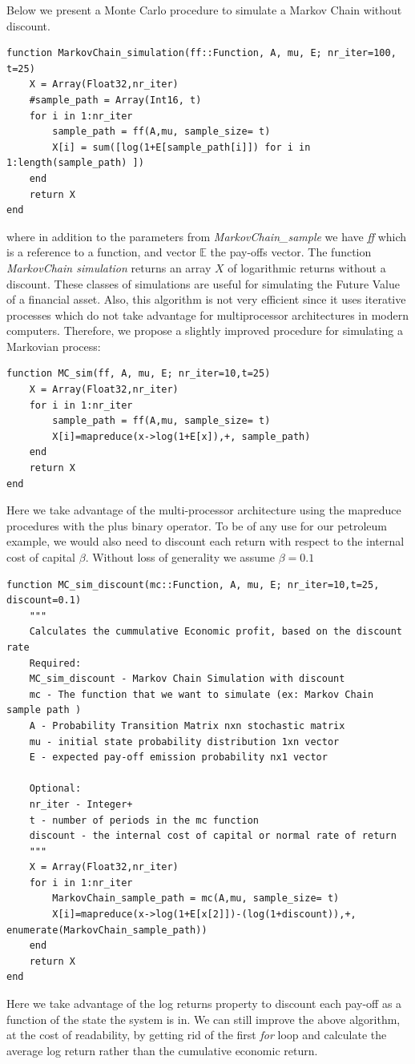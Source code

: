\documentclass[a4paper,12pt]{article}
\theoremstyle{definition}
\begin{document}
Below we present a Monte Carlo procedure to simulate a Markov Chain without discount.

\begin{lstlisting}
function MarkovChain_simulation(ff::Function, A, mu, E; nr_iter=100, t=25)
    X = Array(Float32,nr_iter)
    #sample_path = Array(Int16, t)
    for i in 1:nr_iter
        sample_path = ff(A,mu, sample_size= t)
        X[i] = sum([log(1+E[sample_path[i]]) for i in 1:length(sample_path) ])
    end
    return X
end    
\end{lstlisting}
where in addition to the parameters from \textit{MarkovChain\_sample} we have \textit{ff} which is a reference to a function, and vector $\mathbb{E}$ the pay-offs vector. 
The function \textit{MarkovChain simulation} returns an array $X$ of logarithmic returns without a discount. These classes of simulations are useful for simulating the Future Value of a financial asset.  Also, this algorithm is not very efficient since it uses iterative processes which do not take advantage for multiprocessor architectures in modern computers. Therefore, we propose a slightly improved procedure for simulating a Markovian process:

\begin{lstlisting}
function MC_sim(ff, A, mu, E; nr_iter=10,t=25)
    X = Array(Float32,nr_iter)
    for i in 1:nr_iter
        sample_path = ff(A,mu, sample_size= t)
        X[i]=mapreduce(x->log(1+E[x]),+, sample_path)
    end
    return X
end
\end{lstlisting}
Here we take advantage of the multi-processor architecture using the mapreduce procedures with the plus binary operator. 
To be of any use for our petroleum example, we would also need to discount each return with respect to the internal cost of capital $\beta$. Without loss of generality we assume $\beta = 0.1$
\begin{lstlisting}
function MC_sim_discount(mc::Function, A, mu, E; nr_iter=10,t=25, discount=0.1)
    """
    Calculates the cummulative Economic profit, based on the discount rate
    Required:
    MC_sim_discount - Markov Chain Simulation with discount
    mc - The function that we want to simulate (ex: Markov Chain sample path )
    A - Probability Transition Matrix nxn stochastic matrix
    mu - initial state probability distribution 1xn vector
    E - expected pay-off emission probability nx1 vector
    
    Optional:
    nr_iter - Integer+
    t - number of periods in the mc function
    discount - the internal cost of capital or normal rate of return
    """
    X = Array(Float32,nr_iter)
    for i in 1:nr_iter
        MarkovChain_sample_path = mc(A,mu, sample_size= t)
        X[i]=mapreduce(x->log(1+E[x[2]])-(log(1+discount)),+, enumerate(MarkovChain_sample_path))
    end
    return X
end
\end{lstlisting}
Here we take advantage of the log returns property to discount each pay-off as a function of the state the system is in. 
We can still improve the above algorithm, at the cost of readability, by getting rid of the first \textit{for} loop and calculate the average log return rather than the cumulative economic return.
\end{document}

